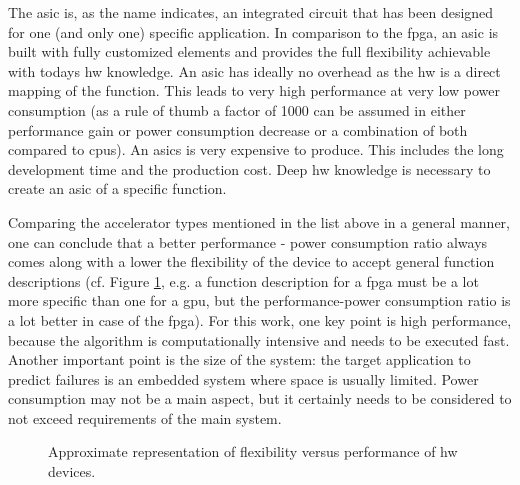 \documentclass[mscthesis]{usiinfthesis}
\begin{document}
\begin{description}
        The \acrfull{asic} is, as the name indicates, an integrated circuit
        that has been designed for one (and only one) specific application. In
        comparison to the \gls{fpga}, an \gls{asic} is built with fully
        customized elements and provides the full flexibility achievable with
        todays \gls{hw} knowledge. An \gls{asic} has ideally no overhead as the
        \gls{hw} is a direct mapping of the function. This leads to very high
        performance at very low power consumption (as a rule of thumb a factor
        of 1000 can be assumed in either performance gain or power consumption
        decrease or a combination of both compared to \glspl{cpu}).  An
        \glspl{asic} is very expensive to produce. This includes the long
        development time and the production cost. Deep \gls{hw} knowledge is
        necessary to create an \gls{asic} of a specific function.
\end{description}

Comparing the accelerator types mentioned in the list above in a general
manner, one can conclude that a better performance - power consumption ratio
always comes along with a lower the flexibility of the device to accept general
function descriptions (cf. Figure \ref{fig:hw}, e.g. a function description
for a \gls{fpga} must be a lot more specific than one for a \gls{gpu}, but the
performance-power consumption ratio is a lot better in case of the \gls{fpga}).
For this work, one key point is high performance, because the algorithm is
computationally intensive and needs to be executed fast. Another important
point is the size of the system: the target application to predict failures is
an embedded system where space is usually limited.  Power consumption may not
be a main aspect, but it certainly needs to be considered to not exceed
requirements of the main system.

\begin{figure}
    \centering
    
    \caption{Approximate representation of flexibility versus performance of
        \acrshort{hw} devices.}
    \label{fig:hw}
\end{figure}
\end{document}
